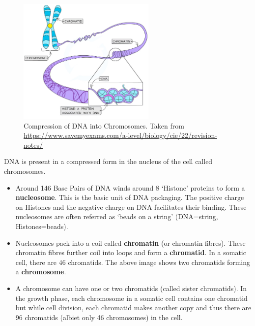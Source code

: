 \documentclass[letterpaper,12pt]{article}
\begin{document}
\begin{figure}[h!]
	\centering
	\includegraphics[width=0.6\textwidth]{figures/chromosomes_unraveled.png}
	\caption{Compression of DNA into Chromosomes. Taken from \url{https://www.savemyexams.com/a-level/biology/cie/22/revision-notes/}}\label{fig1}
\end{figure}

DNA is present in a compressed form in the nucleus of the cell called chromosomes.
\begin{itemize}
	\item Around 146 Base Pairs of DNA winds around 8 `Histone' proteins to form a \textbf{nucleosome}. This is the basic unit of DNA packaging. The positive charge on Histones and the negative charge on DNA facilitates their binding. These nucleosomes are often referred as `beads on a string' (DNA=string, Histones=beads).
	\item Nucleosomes pack into a coil called \textbf{chromatin} (or chromatin fibres). These chromatin fibres further coil into loops and form a \textbf{chromatid}. In a somatic cell, there are 46 chromatids. The above image shows two chromatids forming a \textbf{chromosome}.
	\item A chromosome can have one or two chromatids (called sister chromatids). In the growth phase, each chromosome in a somatic cell contains one chromatid but while cell division, each chromatid makes another copy and thus there are 96 chromatids (albiet only 46 chromosomes) in the cell.
\end{itemize}
\end{document}
